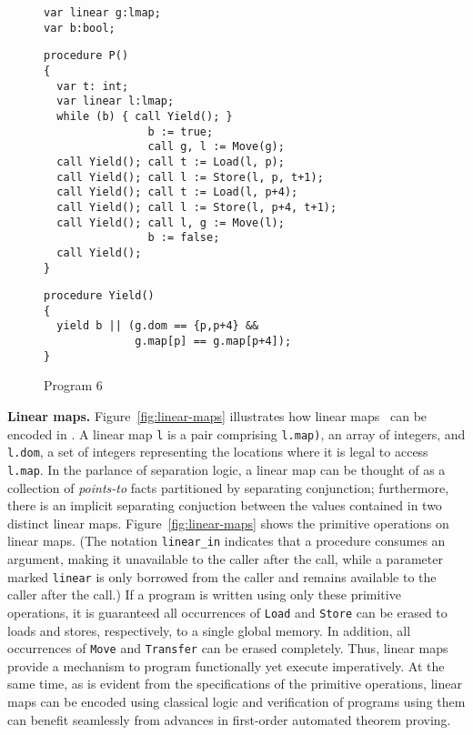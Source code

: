\begin{figure}
\begin{verbatim}
var linear g:lmap;
var b:bool;
\end{verbatim}
\begin{verbatim}
procedure P()
{
  var t: int;
  var linear l:lmap;
  while (b) { call Yield(); }
                b := true;
                call g, l := Move(g);
  call Yield(); call t := Load(l, p);
  call Yield(); call l := Store(l, p, t+1);
  call Yield(); call t := Load(l, p+4);
  call Yield(); call l := Store(l, p+4, t+1);
  call Yield(); call l, g := Move(l);
                b := false;
  call Yield();
}
\end{verbatim}
\begin{verbatim}
procedure Yield() 
{
  yield b || (g.dom == {p,p+4} && 
              g.map[p] == g.map[p+4]);
}
\end{verbatim}
\caption{Program 6}
\label{fig:ex6}
\end{figure}

{\bf Linear maps.}
Figure~\ref{fig:linear-maps} illustrates how linear maps~\cite{LahiriQW11} can be encoded in \civl.
A linear map {\tt l} is a pair comprising {\tt l.map)}, an array of integers, 
and {\tt l.dom}, a set of integers representing the locations where it is legal to access {\tt l.map}.
In the parlance of separation logic, a linear map can be thought of as a collection of
{\em points-to} facts partitioned by separating conjunction; 
furthermore, there is an implicit separating conjuction between the values contained in two distinct linear maps.
Figure~\ref{fig:linear-maps} shows the primitive operations on linear maps.
(The notation {\tt linear\_in} indicates that a procedure consumes an argument,
making it unavailable to the caller after the call,
while a parameter marked {\tt linear} is only borrowed from the caller and remains available to the caller after the call.)
If a program is written using only these primitive operations, it is guaranteed all 
occurrences of {\tt Load} and {\tt Store} can be erased to loads and stores, respectively, 
to a single global memory.  
In addition, all occurrences of {\tt Move} and {\tt Transfer} can be erased completely.
Thus, linear maps provide a mechanism to program functionally yet execute imperatively.
At the same time, as is evident from the specifications of the primitive operations,
linear maps can be encoded using classical logic and verification of programs using them can benefit 
seamlessly from advances in first-order automated theorem proving.


